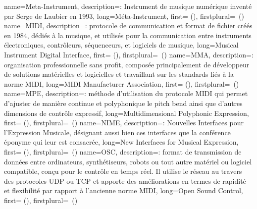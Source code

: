 {
    name={Meta-Instrument},
    description={\textit{}: Instrument de musique numérique inventé par Serge de Laubier en 1993},
    long={Méta-Instrument},
    first={} (),
    firstplural={\glspluralsuffix\ (\glspluralsuffix)}
}
{
    name={MIDI},
    description={\textit{}: protocole de communication et format de fichier créés en 1984, dédiés à la musique, et utilisés pour la communication entre instruments électroniques, contrôleurs, séquenceurs, et logiciels de musique},
    long={Musical Instrument Digital Interface},
   	first={} (),
    firstplural={\glspluralsuffix\ (\glspluralsuffix)}
}
{
    name={MMA},
    description={\textit{}: organisation professionnelle sans profit, composée principalement de développeur de solutions matérielles et logicielles et travaillant sur les standards liés à la norme MIDI},
    long={MIDI Manufacturer Association},
    first={} (),
    firstplural={\glspluralsuffix\ (\glspluralsuffix)}
}
{
    name={MPE},
    description={\textit{}: méthode d'utilisation du protocole MIDI qui permet d'ajuster de manière continue et polyphonique le pitch bend ainsi que d'autres dimensions de contrôle expressif},
    long={Multidimensional Polyphonic Expression},
   	first={} (),
    firstplural={\glspluralsuffix\ (\glspluralsuffix)}
}
{
    name={NIME},
    description={\textit{}: Nouvelles Interfaces pour l'Expression Musicale, désignant aussi bien ces interfaces que la conférence éponyme qui leur est consacrée},
    long={New Interfaces for Musical Expression},
    first={} (),
    firstplural={\glspluralsuffix\ (\glspluralsuffix)}
}
{
    name={OSC},
    description={\textit{}: format de transmission de données entre ordinateurs, synthétiseurs, robots ou tout autre matériel ou logiciel compatible, conçu pour le contrôle en temps réel. Il utilise le réseau au travers des protocoles \gls{UDP} ou \gls{TCP} et apporte des améliorations en termes de rapidité et flexibilité par rapport à l'ancienne norme MIDI},
    long={Open Sound Control},
    first={} (),
    firstplural={\glspluralsuffix\ (\glspluralsuffix)}
}

